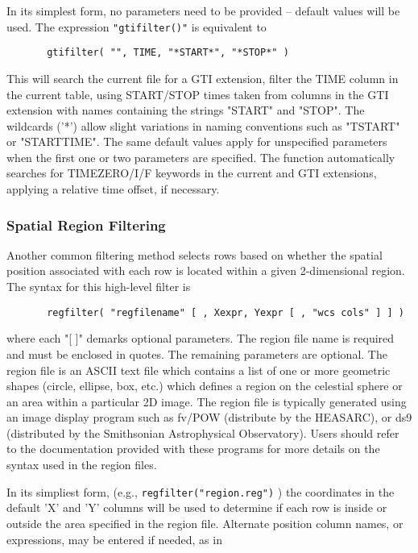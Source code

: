 \documentclass[11pt]{article}
\begin{document}
    In  its  simplest form, no parameters need to be provided -- default
    values will be used.  The expression {\tt "gtifilter()"} is equivalent to
 
\begin{verbatim}
       gtifilter( "", TIME, "*START*", "*STOP*" )
\end{verbatim}
    This will search the current file for a GTI  extension,  filter  the
    TIME  column in the current table, using START/STOP times taken from
    columns in the GTI  extension  with  names  containing  the  strings
    "START"  and "STOP".  The wildcards ('*') allow slight variations in
    naming conventions  such  as  "TSTART"  or  "STARTTIME".   The  same
    default  values  apply for unspecified parameters when the first one
    or  two  parameters  are  specified.   The  function   automatically
    searches   for   TIMEZERO/I/F   keywords  in  the  current  and  GTI
    extensions, applying a relative time offset, if necessary.

\subsubsection{Spatial Region Filtering}

    Another common  filtering method selects rows based on whether the
    spatial position associated with each row is located within a given
    2-dimensional region.  The syntax for this high-level filter is
 
\begin{verbatim}
       regfilter( "regfilename" [ , Xexpr, Yexpr [ , "wcs cols" ] ] )
\end{verbatim}
    where each "[ ]" demarks optional parameters. The region file name
    is required and must be  enclosed in quotes.  The remaining
    parameters are optional.  The region file is an ASCII text file
    which contains a list of one or more geometric shapes (circle,
    ellipse, box, etc.) which defines a region on the celestial sphere
    or an area within a particular 2D image.  The region file is
    typically generated using an image display program such as fv/POW
    (distribute by the HEASARC), or ds9 (distributed by the Smithsonian
    Astrophysical Observatory).  Users should refer to the documentation
    provided with these programs for more details on the syntax used in
    the region files.

    In its simpliest form, (e.g., {\tt regfilter("region.reg")} ) the
    coordinates in the default 'X' and 'Y' columns will be used to
    determine if each row is inside or outside the area specified in
    the region file.  Alternate position column names, or expressions,
    may be entered if needed, as in
 
\end{document}
